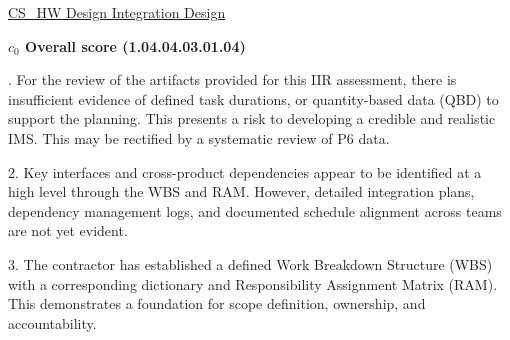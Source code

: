% 


\begin{frame}{\href{run:../local/source-docs/1.04.04.03.01.04.pdf}{CS\_HW Design Integration Design}}
\centering
{}
\par
\vspace{0.75em}
\textbf{\small{\(c_0\) Overall score {\tiny (1.04.04.03.01.04)}}}\\\par
\vspace{0.5em}
\begin{minipage}{0.85\textwidth}
\raggedright
\fontsize{7}{9}. For the review of the artifacts provided for this IIR assessment, there is insufficient evidence of defined task durations, or quantity-based data (QBD) to support the planning. This presents a risk to developing a credible and realistic IMS. This may be rectified by a systematic review of P6 data.\par\vspace{0.5em}2. Key interfaces and cross-product dependencies appear to be identified at a high level through the WBS and RAM. However, detailed integration plans, dependency management logs, and documented schedule alignment across teams are not yet evident.\par\vspace{0.5em}3. The contractor has established a defined Work Breakdown Structure (WBS) with a corresponding dictionary and Responsibility Assignment Matrix (RAM). This demonstrates a foundation for scope definition, ownership, and accountability.\par
\end{minipage}
\end{frame}
